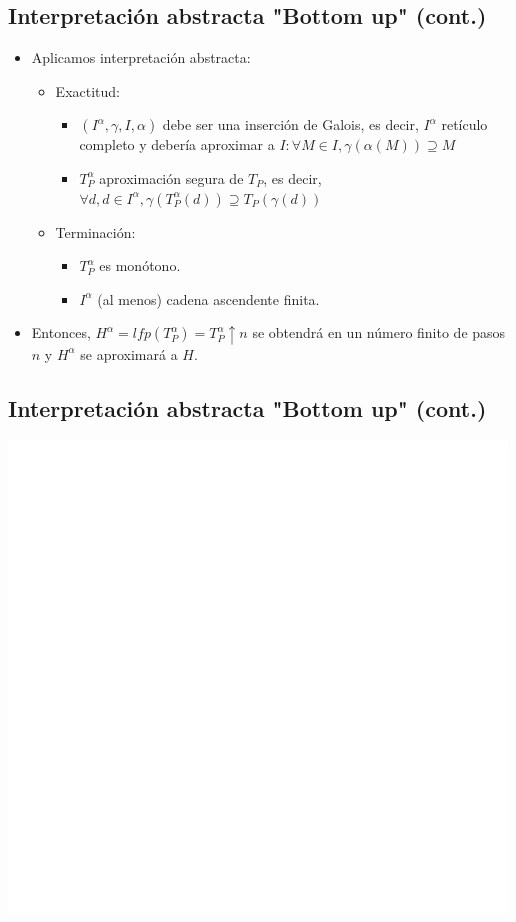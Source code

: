 \documentclass[11pt]{article}
\begin{document}
\subsection*{Interpretación abstracta "Bottom up" (cont.)}
\label{sec:orgfe02350}
\begin{itemize}
\item Aplicamos interpretación abstracta:
\begin{itemize}
\item Exactitud:
\begin{itemize}
\item \((I^\alpha, \gamma, I, \alpha)\) debe ser una inserción de
Galois, es decir, \(I^\alpha\) retículo completo y debería
aproximar a \(I: \forall M \in I, \gamma(\alpha(M)) \supseteq M\)
\item \(T^\alpha_P\) aproximación segura de \(T_P\), es decir, \(\forall d,
      d \in  I^\alpha, \gamma(T^\alpha_P(d)) \supseteq T_P(\gamma(d))\)
\end{itemize}
\item Terminación:
\begin{itemize}
\item \(T^\alpha_P\) es monótono.
\item \(I^\alpha\) (al menos) cadena ascendente finita.
\end{itemize}
\end{itemize}
\item Entonces, \(H^\alpha = lfp(T^\alpha_P) = T^\alpha_P \uparrow n\) se
obtendrá en un número finito de pasos \(n\) y \(H^\alpha\) se aproximará a \(H\).
\end{itemize}


\subsection*{Interpretación abstracta "Bottom up" (cont.)}
\label{sec:orgc8af07e}

\begin{center}
\includegraphics[width=.9\linewidth]{bottomup2.png}
\end{center}
\end{document}
